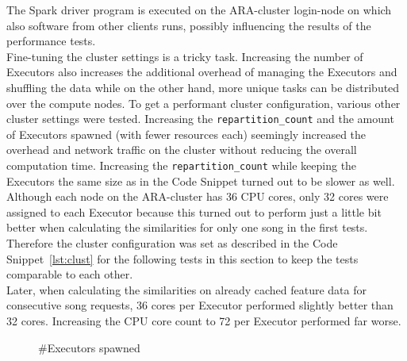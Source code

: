\noindent The Spark driver program is executed on the ARA-cluster login-node on which also software from other clients runs, possibly influencing the results of the performance tests.\\
Fine-tuning the cluster settings is a tricky task. Increasing the number of Executors also increases the additional overhead of managing the Executors and shuffling the data while on the other hand, more unique tasks can be distributed over the compute nodes. To get a performant cluster configuration, various other cluster settings were tested. Increasing the \lstinline{repartition_count} and the amount of Executors spawned (with fewer resources each) seemingly increased the overhead and network traffic on the cluster without reducing the overall computation time. Increasing the \lstinline{repartition_count} while keeping the Executors the same size as in the Code Snippet turned out to be slower as well.\\ 
Although each node on the ARA-cluster has 36 CPU cores, only 32 cores were assigned to each Executor because this turned out to perform just a little bit better when calculating the similarities for only one song in the first tests. Therefore the cluster configuration was set as described in the Code Snippet~\ref{lst:clust} for the following tests in this section to keep the tests comparable to each other.\\
Later, when calculating the similarities on already cached feature data for consecutive song requests, 36 cores per Executor performed slightly better than 32 cores. Increasing the CPU core count to 72 per Executor performed far worse.\\ 

\FloatBarrier
\begin{figure}[htbp]
   	\centering
   	\caption{\#Executors spawned}
   	\label{perfspark7}
\end{figure}
\FloatBarrier

